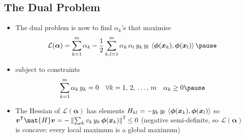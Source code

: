 \begin{slide}
\section{The Dual Problem}

\begin{PauseHighLight}
  \begin{itemize}
  \item The dual problem is now to find $\alpha_k$'s that maximise
    \begin{align*}
      \mathcal{L}(\bm{\alpha}) = \sum_{k=1}^m \alpha_k 
      - \frac{1}{2} \sum_{k,l=1}^m \alpha_k\,\alpha_l
      \,y_k\,y_l\, \inner{\bm{\phi}(\bm{x}_k)}{\bm{\phi}(\bm{x}_l)}\pause
    \end{align*}
  \item subject to constraints
    \begin{align*}
      \sum_{k=1}^m \alpha_k\, y_k
      &= 0
      & \forall k=1,\,2,\,\ldots,\, m \quad \alpha_k \geq 0\pause
    \end{align*}
  \item The Hessian of $\mathcal{L}(\bm{\alpha})$ has elements
    $H_{kl} = - y_k\,y_l\,
    \left\langle {\bm{\phi}(\bm{x}_k)}, {\bm{\phi}(\bm{x}_l)}\right\rangle$ so
    $\bm{v}^\tr\mat{H}\bm{v} = -\left\|\sum_k
      v_k\,y_k\,\bm{\phi}(\bm{x}_k)\right\|^2\leq0$\pause{} (negative
    semi-definite, so $\mathcal{L}(\bm{\alpha})$ is concave: every local
    maximum is a global maximum)\pauseb
  \end{itemize}
\end{PauseHighLight}

\end{slide}


